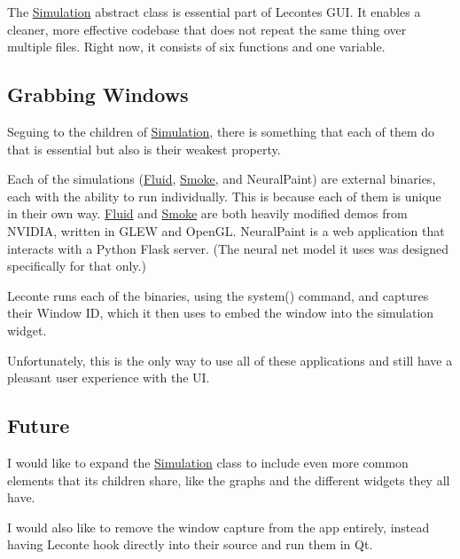 The \mbox{\hyperlink{classSimulation}{Simulation}} abstract class is essential part of Leconte\textquotesingle{}s G\+UI. It enables a cleaner, more effective codebase that does not repeat the same thing over multiple files. Right now, it consists of six functions and one variable.

\subsection*{Grabbing Windows}

Seguing to the children of \mbox{\hyperlink{classSimulation}{Simulation}}, there is something that each of them do that is essential but also is their weakest property.

Each of the simulations (\mbox{\hyperlink{classFluid}{Fluid}}, \mbox{\hyperlink{classSmoke}{Smoke}}, and Neural\+Paint) are external binaries, each with the ability to run individually. This is because each of them is unique in their own way. \mbox{\hyperlink{classFluid}{Fluid}} and \mbox{\hyperlink{classSmoke}{Smoke}} are both heavily modified demos from N\+V\+I\+D\+IA, written in G\+L\+EW and Open\+GL. Neural\+Paint is a web application that interacts with a Python Flask server. (The neural net model it uses was designed specifically for that only.)

Leconte runs each of the binaries, using the {\ttfamily system()} command, and captures their Window ID, which it then uses to embed the window into the simulation widget.

Unfortunately, this is the only way to use all of these applications and still have a pleasant user experience with the UI.

\subsection*{Future}

I would like to expand the \mbox{\hyperlink{classSimulation}{Simulation}} class to include even more common elements that its children share, like the graphs and the different widgets they all have.

I would also like to remove the window capture from the app entirely, instead having Leconte hook directly into their source and run them in Qt. 
